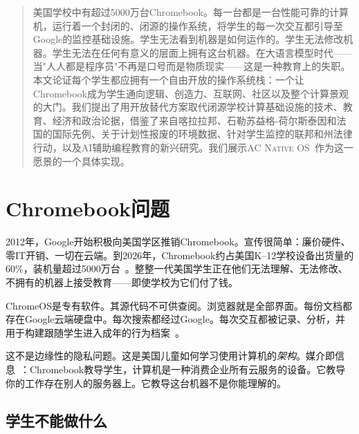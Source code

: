 \documentclass[11pt, a4paper]{article}
\newcommand{\acos}{\textsc{AC Native OS}}
\begin{document}
\begin{multicols}{2}


\begin{abstract}
\noindent
美国学校中有超过5000万台Chromebook。每一台都是一台性能可靠的计算机，运行着一个封闭的、闭源的操作系统，将学生的每一次交互都引导至Google的监控基础设施。学生无法看到机器是如何运作的。学生无法修改机器。学生无法在任何有意义的层面上拥有这台机器。在大语言模型时代——当"人人都是程序员"不再是口号而是物质现实——这是一种教育上的失职。本文论证每个学生都应拥有一个自由开放的操作系统栈：一个让Chromebook成为学生通向逻辑、创造力、互联网、社区以及整个计算景观的大门。我们提出了用开放替代方案取代闭源学校计算基础设施的技术、教育、经济和政治论据，借鉴了来自喀拉拉邦、石勒苏益格-荷尔斯泰因和法国的国际先例、关于计划性报废的环境数据、针对学生监控的联邦和州法律行动，以及AI辅助编程教育的新兴研究。我们展示\acos{}~\citep{scudder2026acos}作为这一愿景的一个具体实现。
\end{abstract}


\section{Chromebook问题}

2012年，Google开始积极向美国学区推销Chromebook。宣传很简单：廉价硬件、零IT开销、一切在云端。到2026年，Chromebook约占美国K--12学校设备出货量的60\%，装机量超过5000万台~\citep{google2024chromeos}。整整一代美国学生正在他们无法理解、无法修改、不拥有的机器上接受教育——即使学校为它们付了钱。

ChromeOS是专有软件。其源代码不可供查阅。浏览器就是全部界面。每份文档都存在Google云端硬盘中。每次搜索都经过Google。每次交互都被记录、分析，并用于构建跟随学生进入成年的行为档案~\citep{zuboff2019surveillance}。

这不是边缘性的隐私问题。这是美国儿童如何学习使用计算机的\emph{架构}。媒介即信息~\citep{mcluhan1964understanding}：Chromebook教导学生，计算机是一种消费企业所有云服务的设备。它教导你的工作存在别人的服务器上。它教导这台机器不是你能理解的。

\subsection{学生不能做什么}


\end{multicols}
\end{document}
